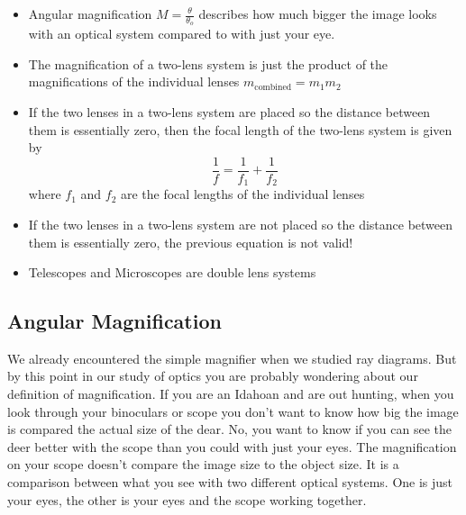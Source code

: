 \documentclass{article}
\begin{document}
\vspace{0.10in}%

\begin{itemize}
\item Angular magnification $M=\frac{\theta }{\theta _{o}}$ describes how
much bigger the image looks with an optical system compared to with just
your eye.

\item The magnification of a two-lens system is just the product of the
magnifications of the individual lenses $m_{\text{combined}}=m_{1}m_{2}$

\item If the two lenses in a two-lens system are placed so the distance
between them is essentially zero, then the focal length of the two-lens
system is given by 
\[
\frac{1}{f}=\frac{1}{f_{1}}+\frac{1}{f_{2}}
\]%
where $f_{1}$ and $f_{2}$ are the focal lengths of the individual lenses

\item If the two lenses in a two-lens system are not placed so the distance
between them is essentially zero, the previous equation is not valid!

\item Telescopes and Microscopes are double lens systems
\end{itemize}

\subsection{Angular Magnification}

We already encountered the simple magnifier when we studied ray diagrams.
But by this point in our study of optics you are probably wondering about
our definition of magnification. If you are an Idahoan and are out hunting,
when you look through your binoculars or scope you don't want to know how
big the image is compared the actual size of the dear. No, you want to know
if you can see the deer better with the scope than you could with just your
eyes. The magnification on your scope doesn't compare the image size to the
object size. It is a comparison between what you see with two different
optical systems. One is just your eyes, the other is your eyes and the scope
working together.
\end{document}
